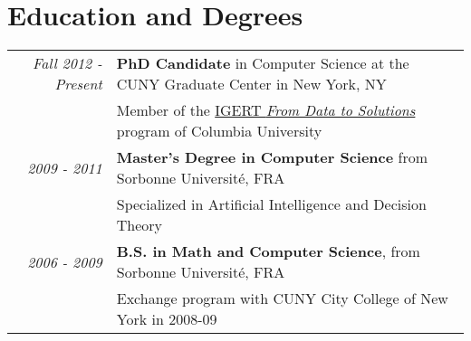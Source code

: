 \documentclass[a4paper,10pt]{article}
\begin{document}
\section{Education and Degrees}
    \vspace{0.2cm}
    \begin{tabular}{rp{14cm}} 
        \hspace{0.35cm} \emph{Fall 2012 - Present} & \textbf{PhD Candidate} in Computer Science at the CUNY Graduate Center in New York, NY\\
         & Member of the \href{http://www.cs.columbia.edu/igert/people_students.shtml}{IGERT {\em From Data to Solutions}} program of Columbia University
        \vspace{0.15cm} \\

        \emph{2009 - 2011} & {\bfseries Master's Degree in Computer Science} from Sorbonne Université, FRA \\
        & Specialized in Artificial Intelligence and Decision Theory
        \vspace{0.15cm} \\

         
        \emph{2006 - 2009} & {\bfseries B.S. in Math and Computer Science}, from Sorbonne Université, FRA \\ 
        & Exchange program with CUNY City College of New York in 2008-09
        \vspace{0.15cm} \\
         
         

    \end{tabular}
\end{document}
